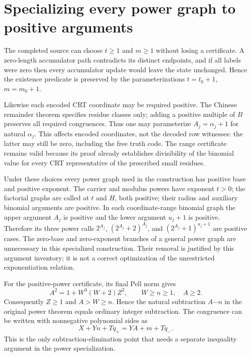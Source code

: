 \section{Specializing every power graph to positive arguments}

The completed source can choose $t\ge1$ and $m\ge1$ without losing a
certificate.  A zero-length accumulator path contradicts its distinct
endpoints, and if all labels were zero then every accumulator update would
leave the state unchanged.  Hence the existence predicate is preserved by
the parameterizations $t=t_0+1$, $m=m_0+1$.

Likewise each encoded CRT coordinate may be required positive.  The Chinese
remainder theorem specifies residue classes only; adding a positive multiple
of $B$ preserves all required congruences.  Thus one may parameterize
$A_j=\alpha_j+1$ for natural $\alpha_j$.  This affects encoded coordinates,
not the decoded row witnesses: the latter may still be zero, including the
free truth code.  The range certificate remains valid because its proof
already establishes divisibility of the binomial value for every CRT
representative of the prescribed small residues.

Under these choices every power graph used in the construction has positive
base and positive exponent.  The carrier and modulus powers have exponent
$t>0$; the factorial graphs are called at $t$ and $H$, both positive;
their radius and auxiliary binomial arguments are positive.  In each
coordinate-range binomial graph the upper argument $A_j$ is positive and
the lower argument $u_j+1$ is positive.  Therefore its three power calls
$2^{A_j}$, $(2^{A_j}+2)^{A_j}$, and $(2^{A_j}+1)^{u_j+1}$ are positive
cases.  The zero-base and zero-exponent branches of a general power graph
are unnecessary in this specialized construction.  Their removal is
justified by this argument inventory; it is not a correct optimization of
the unrestricted exponentiation relation.

For the positive-power certificate, its final Pell norm gives
\[
 A^2=1+W^3(W+2)Z^2,
 \qquad W\ge n\ge1,\quad A\ge2.
\]
Consequently $Z\ge1$ and $A>W\ge n$.  Hence the natural subtraction
$A\mathbin{\dot{-}}n$ in the original power theorem equals ordinary
integer subtraction.  The congruence can be written with nonnegative
polynomial sides as
\[
 X+Yn+Tq_+=YA+m+Tq_-.
\]
This is the only subtraction-elimination point that needs a separate
inequality argument in the power specialization.
